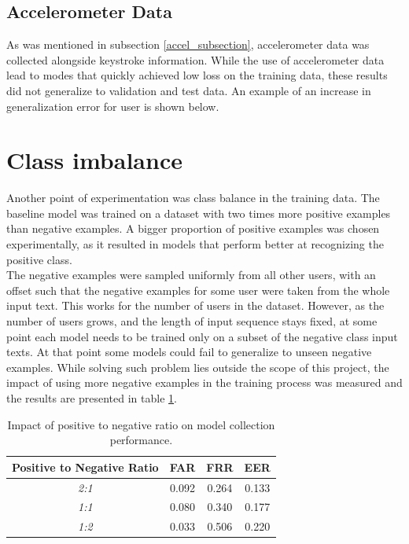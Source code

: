\subsection{Accelerometer Data}
As was mentioned in subsection \ref{accel_subsection}, accelerometer data was collected alongside keystroke information. While the use of accelerometer data lead to modes that quickly achieved low loss on the training data, these results did not generalize to validation and test data. An example of an increase in generalization error for user  is shown below.

\section{Class imbalance}
Another point of experimentation was class balance in the training data. The baseline model was trained on a dataset with two times more positive examples than negative examples. A bigger proportion of positive examples was chosen experimentally, as it resulted in models that perform better at recognizing the positive class. \\ 
The negative examples were sampled uniformly from all other users, with an offset such that the negative examples for some user were taken from the whole input text. This works for the number of users in the dataset. However, as the number of users grows, and the length of input sequence stays fixed, at some point each model needs to be trained only on a subset of the negative class input texts. At that point some models could fail to generalize to unseen negative examples. 
While solving such problem lies outside the scope of this project, the impact of using more negative examples in the training process was measured and the results are presented in table \ref{table:egde_encoding_comp}.


\begin{center}
	\begin{table}[H]
		\begin{center}
			\begin{tabular}{ |c|c|c|c| } 
				\hline
				Positive to Negative Ratio & FAR & FRR & EER \\
				\hline
				\textit{2:1} & 0.092 & 0.264 & 0.133 \\
				\hline
				\textit{1:1} & 0.080 & 0.340 & 0.177 \\
				\hline
				\textit{1:2} & 0.033 & 0.506 & 0.220 \\
				\hline
			\end{tabular}
		\end{center}
		\caption{Impact of positive to negative ratio on model collection performance.}
		\label{table:egde_encoding_comp}
	\end{table}
\end{center}

